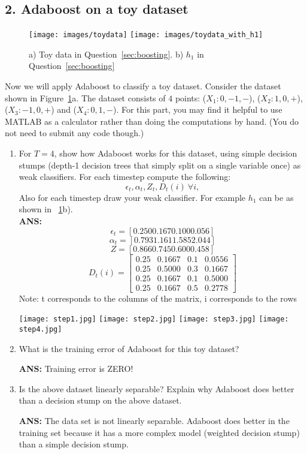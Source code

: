 \documentclass[english]{article}
\begin{document}
\newpage

\subsection*{2. Adaboost on a toy dataset}

\begin{figure}[t]
  \begin{center}
    \texttt{[image: images/toydata]}
    \texttt{[image: images/toydata\_with\_h1]}
  \end{center}
  \caption{a) Toy data in Question~\ref{sec:boosting}. b) $h_1$ in Question~\ref{sec:boosting}}
  \label{fig:toydata}
\end{figure}

Now we will apply Adaboost to classify a toy dataset. Consider the
dataset shown in Figure~\ref{fig:toydata}a. The dataset consists of
$4$ points: ($X_1 : 0,-1,-$), ($X_2 : 1,0,+$), ($X_3 : -1,0,+$) and
($X_4 : 0,1,-$).  For this part, you may find it helpful to use MATLAB
as a calculator rather than doing the computations by hand.  (You do
not need to submit any code though.)

\begin{enumerate}
\item  For $T=4$, show how Adaboost works for this dataset,
  using simple decision stumps (depth-1 decision trees that simply
  split on a single variable once) as weak classifiers.  For each
  timestep compute the following:
  \[ \epsilon_t, \alpha_t, Z_t, D_t(i)~\forall i, \] Also for each
  timestep draw your weak classifier. For example $h_1$ can be as
  shown in ~\ref{fig:toydata}b). 
\\
{\bf ANS: }
\[
\epsilon_t = [0.250 0.167 0.100 0.056]
\]
\[
\alpha_t = [0.793 1.161 1.585 2.044]
\]
\[
Z = [0.866 0.745 0.600 0.458]
\]
\[
D_t(i) = 
\begin{bmatrix}
0.25 & 0.1667 & 0.1 & 0.0556\\
0.25 & 0.5000 & 0.3 & 0.1667\\
0.25 & 0.1667 & 0.1 & 0.5000\\
0.25 & 0.1667 & 0.5 & 0.2778 
\end{bmatrix}
\]Note: t corresponds to the columns of the matrix, i corresponds to the rows

\newpage
\texttt{[image: step1.jpg]}
\texttt{[image: step2.jpg]}
\texttt{[image: step3.jpg]}
\texttt{[image: step4.jpg]}
\item 
  What is the training error of Adaboost for this toy dataset?

{\bf ANS: }Training error is ZERO!

\item 
  Is the above dataset linearly separable? Explain why Adaboost does
  better than a decision stump on the above dataset.

{\bf ANS: } The data set is not linearly separable. Adaboost does better in the training set because it has a more complex model (weighted decision stump) than a simple decision stump.

\end{enumerate}
\end{document}

